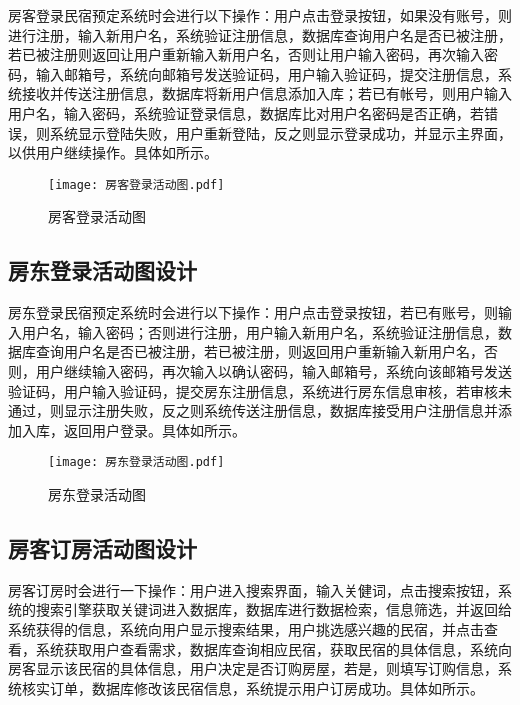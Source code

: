 \documentclass[lang=cn,11pt,a4paper,cite=authoryear]{elegantpaper}
\begin{document}
房客登录民宿预定系统时会进行以下操作：用户点击登录按钮，如果没有账号，则进行注册，输入新用户名，系统验证注册信息，数据库查询用户名是否已被注册，若已被注册则返回让用户重新输入新用户名，否则让用户输入密码，再次输入密码，输入邮箱号，系统向邮箱号发送验证码，用户输入验证码，提交注册信息，系统接收并传送注册信息，数据库将新用户信息添加入库；若已有帐号，则用户输入用户名，输入密码，系统验证登录信息，数据库比对用户名密码是否正确，若错误，则系统显示登陆失败，用户重新登陆，反之则显示登录成功，并显示主界面，以供用户继续操作。具体如所示。

\begin{figure}[]
    \centering
    \texttt{[image: 房客登录活动图.pdf]}
    \caption{房客登录活动图}
    \label{fig:房客登录活动图}
\end{figure}

\subsection{房东登录活动图设计}

房东登录民宿预定系统时会进行以下操作：用户点击登录按钮，若已有账号，则输入用户名，输入密码；否则进行注册，用户输入新用户名，系统验证注册信息，数据库查询用户名是否已被注册，若已被注册，则返回用户重新输入新用户名，否则，用户继续输入密码，再次输入以确认密码，输入邮箱号，系统向该邮箱号发送验证码，用户输入验证码，提交房东注册信息，系统进行房东信息审核，若审核未通过，则显示注册失败，反之则系统传送注册信息，数据库接受用户注册信息并添加入库，返回用户登录。具体如所示。

\begin{figure}[]
    \centering
    \texttt{[image: 房东登录活动图.pdf]}
    \caption{房东登录活动图}
    \label{fig:房东登录活动图}
\end{figure}

\subsection{房客订房活动图设计}

房客订房时会进行一下操作：用户进入搜索界面，输入关健词，点击搜索按钮，系统的搜索引擎获取关键词进入数据库，数据库进行数据检索，信息筛选，并返回给系统获得的信息，系统向用户显示搜索结果，用户挑选感兴趣的民宿，并点击查看，系统获取用户查看需求，数据库查询相应民宿，获取民宿的具体信息，系统向房客显示该民宿的具体信息，用户决定是否订购房屋，若是，则填写订购信息，系统核实订单，数据库修改该民宿信息，系统提示用户订房成功。具体如所示。
\end{document}
